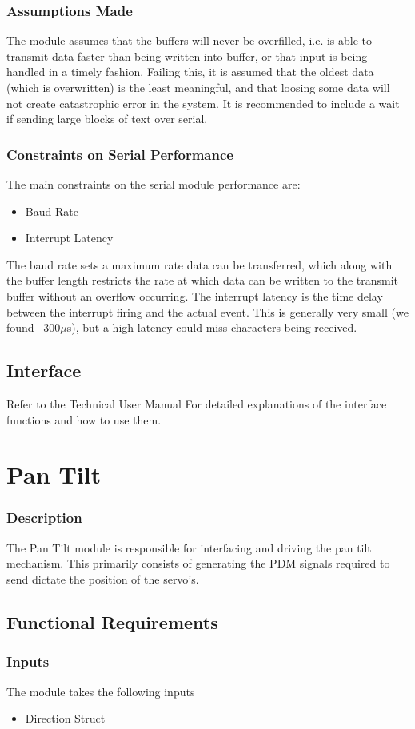 \documentclass[]{report}
\begin{document}
\subsubsection{Assumptions Made}
The module assumes that the buffers will never be overfilled, i.e. is able to transmit data faster than being written into buffer, or that input is being handled in a timely fashion. Failing this, it is assumed that the oldest data (which is overwritten) is the least meaningful, and that loosing some data will not create catastrophic error in the system. It is recommended to include a wait if sending large blocks of text over serial.

\subsubsection{Constraints on Serial Performance}
The main constraints on the serial module performance are:
\begin{itemize}
	\item Baud Rate
	\item Interrupt Latency
\end{itemize}
The baud rate sets a maximum rate data can be transferred, which along with the buffer length restricts the rate at which data can be written to the transmit buffer without an overflow occurring.
The interrupt latency is the time delay between the interrupt firing and the actual event. This is generally very small (we found ~300$\mu$s), but a high latency could miss characters being received.

\subsection{Interface}
Refer to the Technical User Manual For detailed explanations of the interface functions and how to use them.

\section{Pan Tilt}
\subsubsection{Description}
The Pan Tilt module is responsible for interfacing and driving the pan tilt mechanism. This primarily consists of generating the PDM signals required to send dictate the position of the servo's.

\subsection{Functional Requirements}
\subsubsection{Inputs}
The module takes the following inputs
\begin{itemize}
	\item Direction Struct
\end{itemize}
\end{document}

